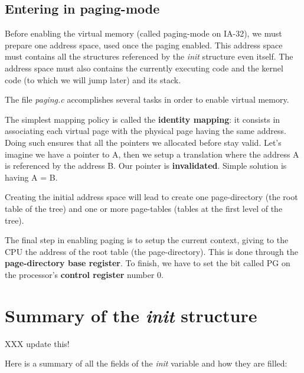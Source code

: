 \subsection{Entering in paging-mode}

Before enabling the virtual memory (called paging-mode on IA-32), we
must prepare one address space, used once the paging enabled. This
address space must contains all the structures referenced by the
\textit{init} structure even itself. The address space must also
contains the currently executing code and the kernel code (to which we
will jump later) and its stack.

The file \textit{paging.c} accomplishes several tasks in order to
enable virtual memory.

The simplest mapping policy is called the \textbf{identity mapping}:
it consists in associating each virtual page with the physical page
having the same address. Doing such ensures that all the pointers we
allocated before stay valid. Let's imagine we have a pointer to A,
then we setup a translation where the address A is referenced by the
address B. Our pointer is \textbf{invalidated}. Simple solution is
having A = B.

Creating the initial address space will lead to create one
page-directory (the root table of the tree) and one or more
page-tables (tables at the first level of the tree).

The final step in enabling paging is to setup the current context,
giving to the CPU the address of the root table (the
page-directory). This is done through the \textbf{page-directory base
register}. To finish, we have to set the bit called PG on the
processor's \textbf{control register} number 0.

%
%

\section{Summary of the \textit{init} structure}

XXX update this!

Here is a summary of all the fields of the \textit{init} variable and
how they are filled:

